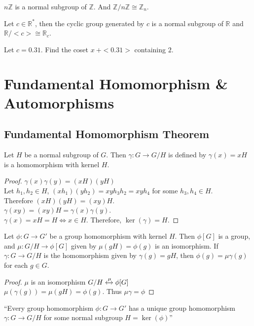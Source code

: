 \begin{remark}
	$n\mathbb{Z}$ is a normal subgroup of $\mathbb{Z}$. And $\mathbb{Z}/n\mathbb{Z} \cong \mathbb{Z}_n$.
\end{remark}

\begin{remark}
	Let $c \in \mathbb{R}^*$, then the cyclic group generated by $c$ is a normal subgroup of $\mathbb{R}$ and $\mathbb{R}/<c> \cong \mathbb{R}_c$.
\end{remark}

\begin{question}
	Let $c = 0.31$. Find the coset $x\ +<0.31>$ containing $2$.
\end{question}
\pagebreak

\section{Fundamental Homomorphism \& Automorphisms}
\subsection{Fundamental Homomorphism Theorem}
\begin{theorem}
	Let $H$ be a normal subgroup of $G$. Then $\gamma : G \to G/H$ is defined by $\gamma(x) = xH$  is a homomorphism with kernel $H$.
\end{theorem}
\begin{proof}
	$\gamma(x)\gamma(y) = (xH)(yH)$\\
	Let $h_1,h_2 \in H$, $(xh_1)(yh_2) = xyh_3h_2 = xyh_4$ for some $h_3,h_4 \in H$.\\
	Therefore $(xH)(yH) = (xy)H$.\\
	$\gamma(xy) = (xy)H = \gamma(x)\gamma(y)$.\\
	$\gamma(x) = xH = H \iff x \in H$. Therefore, $\ker(\gamma) = H$.
\end{proof}

\begin{theorem}
	Let $\phi : G \to G'$ be a group homomorphism with kernel $H$. Then $\phi[G]$ is a group, and $\mu : G/H \to \phi[G]$ given by $\mu(gH) = \phi(g)$ is an isomorphism. If $\gamma : G \to G/H$ is the homomorphism given by $\gamma(g) = gH$, then $\phi(g) = \mu\gamma(g)$ for each $g \in G$.
\end{theorem}
\begin{proof}
	$\mu$ is an isomorphism $G/H \xleftrightarrow{\mu}\phi[G]$\\
	$\mu(\gamma(g)) = \mu(gH) = \phi(g)$. Thus $\mu\gamma = \phi$
\end{proof}
``Every group homomorphism $\phi : G \to G'$ has a unique group homomorphism $\gamma : G \to G/H$ for some normal subgroup $H = \ker(\phi)$''

